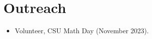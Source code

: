 \documentclass{cv_style}
\begin{document}
		
	\section{Outreach}
		\begin{itemize}
			\item Volunteer, CSU Math Day (November 2023).
		\end{itemize}
		
\end{document}
